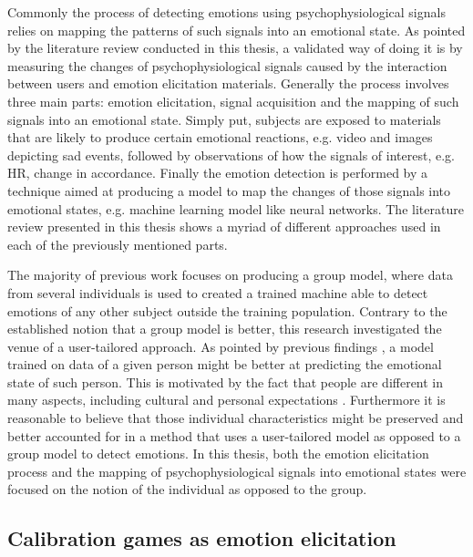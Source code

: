 Commonly the process of detecting emotions using psychophysiological signals relies on mapping the patterns of such signals into an emotional state. As pointed by the literature review conducted in this thesis, a validated way of doing it is by measuring the changes of psychophysiological signals caused by the interaction between users and emotion elicitation materials. Generally the process involves three main parts: emotion elicitation, signal acquisition and the mapping of such signals into an emotional state. Simply put, subjects are exposed to materials that are likely to produce certain emotional reactions, e.g. video and images depicting sad events, followed by observations of how the signals of interest, e.g. HR, change in accordance. Finally the emotion detection is performed by a technique aimed at producing a model to map the changes of those signals into emotional states, e.g. machine learning model like neural networks. The literature review presented in this thesis shows a myriad of different approaches used in each of the previously mentioned parts.

The majority of previous work focuses on producing a group model, where data from several individuals is used to created a trained machine able to detect emotions of any other subject outside the training population. Contrary to the established notion that a group model is better, this research investigated the venue of a user-tailored approach. As pointed by previous findings \parencite{bailenson2008real}, a model trained on data of a given person might be better at predicting the emotional state of such person. This is motivated by the fact that people are different in many aspects, including cultural and personal expectations \parencite{goldberg1993structure}. Furthermore it is reasonable to believe that those individual characteristics might be preserved and better accounted for in a method that uses a user-tailored model as opposed to a group model to detect emotions. In this thesis, both the emotion elicitation process and the mapping of psychophysiological signals into emotional states were focused on the notion of the individual as opposed to the group.

\subsection{Calibration games as emotion elicitation}


